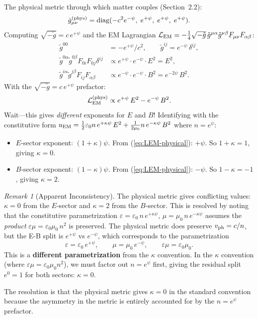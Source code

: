 \documentclass[11pt,a4paper]{article}
\theoremstyle{definition}
\theoremstyle{remark}
\newtheorem{remark}{Remark}
\begin{document}
The physical metric through which matter couples (Section~2.2):
\begin{equation}\label{eq:physical}
\tilde{g}_{\mu\nu}^{\rm (phys)} = \mathrm{diag}(-c^2 e^{-\psi},\;
e^{+\psi},\; e^{+\psi},\; e^{+\psi}).
\end{equation}
Computing $\sqrt{-\tilde{g}} = c\, e^{+\psi}$ and the EM Lagrangian
$\mathcal{L}_{\rm EM} = -\frac{1}{4}\sqrt{-\tilde{g}}\,
\tilde{g}^{\mu\alpha}\tilde{g}^{\nu\beta} F_{\mu\nu}F_{\alpha\beta}$:
\begin{align}
\tilde{g}^{00} &= -e^{+\psi}/c^2, \qquad
\tilde{g}^{ij} = e^{-\psi}\,\delta^{ij}, \\[4pt]
\tilde{g}^{0\alpha}\tilde{g}^{0\beta}F_{0i}F_{0j}\delta^{ij}
&\propto e^{+\psi}\cdot e^{-\psi}\cdot E^2 = E^2, \\[4pt]
\tilde{g}^{i\alpha}\tilde{g}^{j\beta}F_{ij}F_{\alpha\beta}
&\propto e^{-\psi}\cdot e^{-\psi}\cdot B^2 = e^{-2\psi}\,B^2.
\end{align}
With the $\sqrt{-\tilde{g}} = c\,e^{+\psi}$ prefactor:
\begin{equation}\label{eq:LEM-physical}
\mathcal{L}_{\rm EM}^{\rm (phys)} \propto
e^{+\psi}\,E^2 - e^{-\psi}\,B^2.
\end{equation}
Wait---this gives \textit{different} exponents for $E$ and $B$!
Identifying with the constitutive form
$u_{\rm EM} = \frac{1}{2}\varepsilon_0 n\,e^{+\kappa\psi}\,E^2
+ \frac{1}{2\mu_0}n\,e^{-\kappa\psi}\,B^2$
where $n = e^\psi$:
\begin{itemize}
\item $E$-sector exponent: $(1+\kappa)\psi$.  From (\ref{eq:LEM-physical}): $+\psi$.
  So $1 + \kappa = 1$, giving $\kappa = 0$.
\item $B$-sector exponent: $(1-\kappa)\psi$.  From (\ref{eq:LEM-physical}): $-\psi$.
  So $1 - \kappa = -1$, giving $\kappa = 2$.
\end{itemize}

\begin{remark}[Apparent Inconsistency]
The physical metric gives conflicting values: $\kappa = 0$ from the
$E$-sector and $\kappa = 2$ from the $B$-sector.  This is resolved by
noting that the constitutive parametrization
$\varepsilon = \varepsilon_0\,n\,e^{+\kappa\psi}$,
$\mu = \mu_0\,n\,e^{-\kappa\psi}$ assumes the \textit{product}
$\varepsilon\mu = \varepsilon_0\mu_0\,n^2$ is preserved.  The physical
metric does preserve $v_{\rm ph} = c/n$, but the E-B split is
$e^{+\psi}$ vs $e^{-\psi}$, which corresponds to the parametrization
\begin{equation}
\varepsilon = \varepsilon_0\,e^{+\psi}, \qquad
\mu = \mu_0\,e^{-\psi}, \qquad
\varepsilon\mu = \varepsilon_0\mu_0.
\end{equation}
This is a \textbf{different parametrization} from the $\kappa$ convention.
In the $\kappa$ convention (where $\varepsilon\mu = \varepsilon_0\mu_0 n^2$),
we must factor out $n = e^\psi$ first, giving the residual split
$e^{0} = 1$ for both sectors: $\kappa = 0$.

The resolution is that the physical metric gives $\kappa = 0$ in the
standard convention because the asymmetry in the metric is entirely
accounted for by the $n = e^\psi$ prefactor.
\end{remark}
\end{document}

